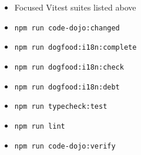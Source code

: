 \begin{itemize}
\tightlist
\item
  Focused Vitest suites listed above
\item
  \texttt{n\allowbreak{}p\allowbreak{}m\allowbreak{} \allowbreak{}r\allowbreak{}u\allowbreak{}n\allowbreak{} \allowbreak{}c\allowbreak{}o\allowbreak{}d\allowbreak{}e\allowbreak{}-\allowbreak{}d\allowbreak{}o\allowbreak{}j\allowbreak{}o\allowbreak{}:\allowbreak{}c\allowbreak{}h\allowbreak{}a\allowbreak{}n\allowbreak{}g\allowbreak{}e\allowbreak{}d}
\item
  \texttt{n\allowbreak{}p\allowbreak{}m\allowbreak{} \allowbreak{}r\allowbreak{}u\allowbreak{}n\allowbreak{} \allowbreak{}d\allowbreak{}o\allowbreak{}g\allowbreak{}f\allowbreak{}o\allowbreak{}o\allowbreak{}d\allowbreak{}:\allowbreak{}i\allowbreak{}1\allowbreak{}8\allowbreak{}n\allowbreak{}:\allowbreak{}c\allowbreak{}o\allowbreak{}m\allowbreak{}p\allowbreak{}l\allowbreak{}e\allowbreak{}t\allowbreak{}e}
\item
  \texttt{n\allowbreak{}p\allowbreak{}m\allowbreak{} \allowbreak{}r\allowbreak{}u\allowbreak{}n\allowbreak{} \allowbreak{}d\allowbreak{}o\allowbreak{}g\allowbreak{}f\allowbreak{}o\allowbreak{}o\allowbreak{}d\allowbreak{}:\allowbreak{}i\allowbreak{}1\allowbreak{}8\allowbreak{}n\allowbreak{}:\allowbreak{}c\allowbreak{}h\allowbreak{}e\allowbreak{}c\allowbreak{}k}
\item
  \texttt{n\allowbreak{}p\allowbreak{}m\allowbreak{} \allowbreak{}r\allowbreak{}u\allowbreak{}n\allowbreak{} \allowbreak{}d\allowbreak{}o\allowbreak{}g\allowbreak{}f\allowbreak{}o\allowbreak{}o\allowbreak{}d\allowbreak{}:\allowbreak{}i\allowbreak{}1\allowbreak{}8\allowbreak{}n\allowbreak{}:\allowbreak{}d\allowbreak{}e\allowbreak{}b\allowbreak{}t}
\item
  \texttt{n\allowbreak{}p\allowbreak{}m\allowbreak{} \allowbreak{}r\allowbreak{}u\allowbreak{}n\allowbreak{} \allowbreak{}t\allowbreak{}y\allowbreak{}p\allowbreak{}e\allowbreak{}c\allowbreak{}h\allowbreak{}e\allowbreak{}c\allowbreak{}k\allowbreak{}:\allowbreak{}t\allowbreak{}e\allowbreak{}s\allowbreak{}t}
\item
  \texttt{n\allowbreak{}p\allowbreak{}m\allowbreak{} \allowbreak{}r\allowbreak{}u\allowbreak{}n\allowbreak{} \allowbreak{}l\allowbreak{}i\allowbreak{}n\allowbreak{}t}
\item
  \texttt{n\allowbreak{}p\allowbreak{}m\allowbreak{} \allowbreak{}r\allowbreak{}u\allowbreak{}n\allowbreak{} \allowbreak{}c\allowbreak{}o\allowbreak{}d\allowbreak{}e\allowbreak{}-\allowbreak{}d\allowbreak{}o\allowbreak{}j\allowbreak{}o\allowbreak{}:\allowbreak{}v\allowbreak{}e\allowbreak{}r\allowbreak{}i\allowbreak{}f\allowbreak{}y}

\end{itemize}
